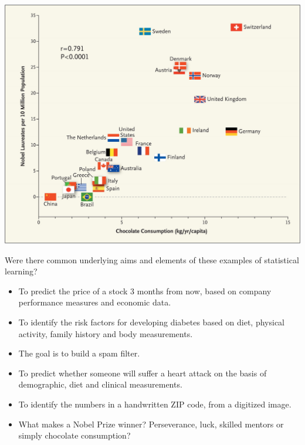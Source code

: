 \documentclass[ignorenonframetext,]{beamer}
\providecommand{\tightlist}{%
  \setlength{\itemsep}{0pt}\setlength{\parskip}{0pt}}
\begin{document}
\begin{frame}

\includegraphics{chocolate.jpeg}

\end{frame}

\begin{frame}

\begin{block}{Were there common underlying aims and elements of these
examples of statistical learning?}

\begin{itemize}
\tightlist
\item
  To predict the price of a stock 3 months from now, based on company
  performance measures and economic data.
\item
  To identify the risk factors for developing diabetes based on diet,
  physical activity, family history and body measurements.
\item
  The goal is to build a spam filter.
\item
  To predict whether someone will suffer a heart attack on the basis of
  demographic, diet and clinical measurements.
\item
  To identify the numbers in a handwritten ZIP code, from a digitized
  image.
\item
  What makes a Nobel Prize winner? Perseverance, luck, skilled mentors
  or simply chocolate consumption?
\end{itemize}

\end{block}

\end{frame}
\end{document}
